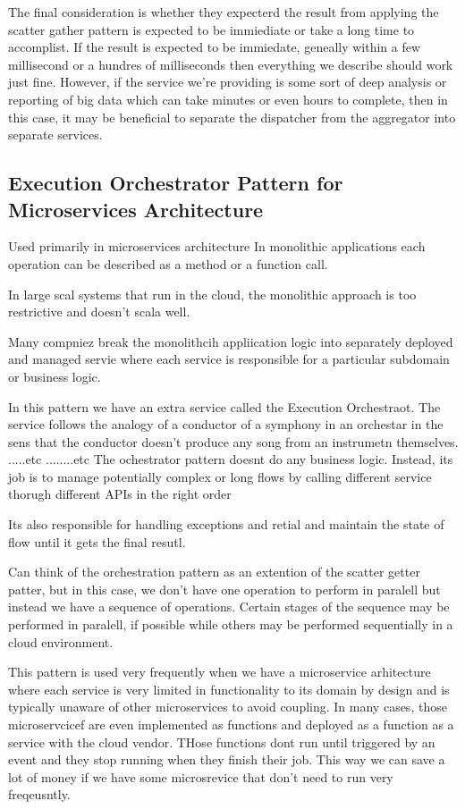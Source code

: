\documentclass[a4paper, 11pt]{book}
\begin{document}
{    The final consideration is whether they expecterd the result from applying the scatter gather pattern is expected to be immiediate or take a long time to accomplist.
    If the result is expected to be immiedate, geneally within a few millisecond or a hundres of milliseconds then everything we describe should work just fine.
    However, if the service we're providing is some sort of deep analysis or reporting of big data which can take minutes or even hours to complete, then in this case, it may be beneficial to separate the dispatcher from the aggregator into separate services.

    \subsection{Execution Orchestrator Pattern for Microservices Architecture}
    Used primarily in microservices architecture
    In monolithic applications each operation can be described as a method or a function call.

    In large scal systems that run in the cloud, the monolithic approach is too restrictive and doesn't scala well.

    Many compniez break the monolithcih appliication logic into separately deployed and managed servie where each service is responsible for a particular subdomain or business logic.

    In this pattern we have an extra service called the Execution Orchestraot.
    The service follows the analogy of a conductor of a symphony in an orchestar in the sens that the conductor doesn't produce any song from an instrumetn themselves.
    .....etc ........etc
    The ochestrator pattern doesnt do any business logic.
    Instead, its job is to manage potentially complex or long flows by calling different service thorugh different APIs in the right order

    Its also responsible for handling exceptions and retial and maintain the state of flow until it gets the final resutl.

    Can think of the orchestration pattern as an extention of the scatter getter patter, but in this case, we don't have one operation to perform in paralell but instead we have a sequence of operations.
    Certain stages of the sequence may be performed in paralell, if possible while others may be performed sequentially in a cloud environment.

    This pattern is used very frequently when we have a microservice arhitecture where each service is very limited in functionality to its domain by design and is typically unaware of other microservices to avoid coupling.
    In many cases, those microservcicef are even implemented as functions and deployed as a function as a service with the cloud vendor.
    THose functions dont run until triggered by an event and they stop running when they finish their job.
    This way we can save a lot of money if we have some microsrevice that don't need to run very freqeusntly.

}
\end{document}
